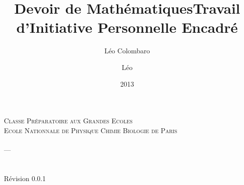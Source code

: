 \documentclass[11pt,a4paper]{report}
\author{Léo Colombaro}
\title{Devoir de Mathématiques}
\title{Travail d'Initiative Personnelle Encadré}
\author{Léo \bsc{Colombaro}}
\date{2013\space\textperiodcentered\space 2014}
\begin{document}
\makeatletter
  \begin{titlepage}
  \centering
      {\large \textsc{Classe Préparatoire aux Grandes Ecoles}}\\
      \textsc{Ecole Nationnale de Physique Chimie Biologie de Paris}\\
    \vfill
      {\LARGE \@title} \\
    \vspace{2em}
      {---} \\
    \vspace{2em}
      {\large \@author} \\
      {\@date} \\
    \vfill
      {\small Révision 0.0.1}
  \end{titlepage}
\makeatother

%
\end{document}
